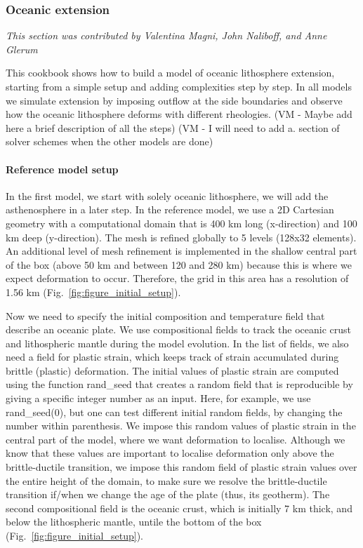 \subsubsection{Oceanic extension}
\label{sec:cookbooks-oceanic-extension}
\textit{This section was contributed by Valentina Magni, John Naliboff, and Anne Glerum}

This cookbook shows how to build a model of oceanic lithosphere extension, starting from a simple setup and adding complexities step by step. In all models we simulate extension by imposing outflow at the side boundaries and observe how the oceanic lithosphere deforms with different rheologies. 
(VM - Maybe add here a brief description of all the steps)
(VM - I will need to add a. section of solver schemes when the other models are done)

\paragraph{Reference model setup}
In the first model, we start with solely oceanic lithosphere, we will add the asthenosphere in a later step. In the reference model, we use a 2D Cartesian geometry with a computational domain that is 400 km long (x-direction) and 100 km deep (y-direction). The mesh is refined globally to 5 levels (128x32 elements). An additional level of mesh refinement is implemented in the shallow central part of the box (above 50 km and between 120 and 280 km) because this is where we expect deformation to occur. Therefore, the grid in this area has a resolution of 1.56 km (Fig.~\ref{fig:figure_initial_setup}).




Now we need to specify the initial composition and temperature field that describe an oceanic plate. We use compositional fields to track the oceanic crust and lithospheric mantle during the model evolution. In the list of fields, we also need a field for plastic strain, which keeps track of strain accumulated during brittle (plastic) deformation. 
The initial values of plastic strain are computed using the function rand\_seed that creates a random field that is reproducible by giving a specific integer number as an input. Here, for example, we use rand\_seed(0), but one can test different initial random fields, by changing the number within parenthesis. We impose this random values of plastic strain in the central part of the model, where we want deformation to localise. Although we know that these values are important to localise deformation only above the brittle-ductile transition, we impose this random field of plastic strain values over the entire height of the domain, to make sure we resolve the brittle-ductile transition if/when we change the age of the plate (thus, its geotherm). The second compositional field is the oceanic crust, which is initially 7 km thick, and below the lithospheric mantle, untile the bottom of the box (Fig.~\ref{fig:figure_initial_setup}).

